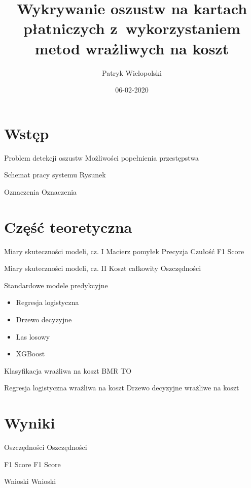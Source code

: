 \documentclass{beamer}
\title{\large Wykrywanie oszustw na kartach płatniczych z~wykorzystaniem metod wrażliwych na koszt}
\institute{Wydział Matematyki Politechniki Wrocławskiej \\ Promotor: dr inż. Andrzej Giniewicz}
\author{Patryk Wielopolski}
\date{06-02-2020}
\begin{document}
\section{Wstęp}

\begin{frame}{Problem detekcji oszustw}
	Możliwości popełnienia przestępstwa
\end{frame}

\begin{frame}{Schemat pracy systemu}
	Rysunek
\end{frame}

\begin{frame}{Oznaczenia}
	Oznaczenia
\end{frame}

\section{Część teoretyczna}

\begin{frame}{Miary skuteczności modeli, cz. I}
	Macierz pomyłek
	Precyzja
	Czułość
	F1 Score
\end{frame}

\begin{frame}{Miary skuteczności modeli, cz. II}
	Koszt całkowity
	Oszczędności
\end{frame}

\begin{frame}{Standardowe modele predykcyjne}
	\begin{itemize}
		\item Regresja logistyczna
		\item Drzewo decyzyjne
		\item Las losowy
		\item XGBoost
	\end{itemize}
\end{frame}

\begin{frame}{Klasyfikacja wrażliwa na koszt}
	BMR
	TO
\end{frame}

\begin{frame}
	Regresja logistyczna wrażliwa na koszt
	Drzewo decyzyjne wrażliwe na koszt
\end{frame}


\section{Wyniki}

\begin{frame}{Oszczędności}
	Oszczędności
\end{frame}

\begin{frame}{F1 Score}
	F1 Score
\end{frame}

\begin{frame}{Wnioski}
	Wnioski
\end{frame}
\end{document}
